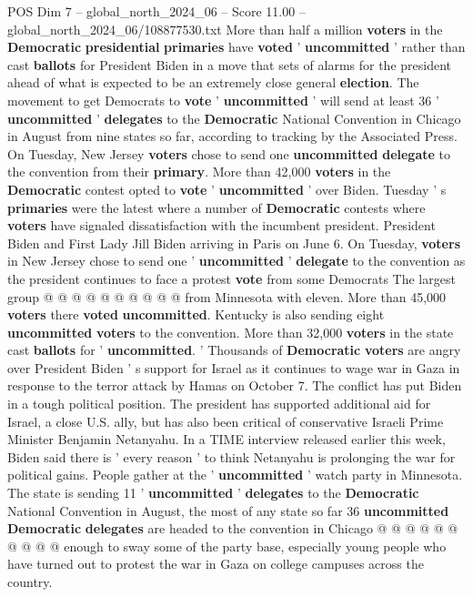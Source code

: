 \begin{textsample}{POS Dim 7 – global\_north\_2024\_06 – Score 11.00 – global\_north\_2024\_06/108877530.txt}  \label{ex:f7_pos_085}
More than half a million \textbf{voters} in the \textbf{Democratic} \textbf{presidential} \textbf{primaries} have \textbf{voted} ' \textbf{uncommitted} ' rather than cast \textbf{ballots} for President Biden in a move that sets of alarms for the president ahead of what is expected to be an extremely close general \textbf{election}.
The movement to get Democrats to \textbf{vote} ' \textbf{uncommitted} ' will send at least 36 ' \textbf{uncommitted} ' \textbf{delegates} to the \textbf{Democratic} National Convention in Chicago in August from nine states so far, according to tracking by the Associated Press.
On Tuesday, New Jersey \textbf{voters} chose to send one \textbf{uncommitted} \textbf{delegate} to the convention from their \textbf{primary}.
More than 42,000 \textbf{voters} in the \textbf{Democratic} contest opted to \textbf{vote} ' \textbf{uncommitted} ' over Biden.
Tuesday ' s \textbf{primaries} were the latest where a number of \textbf{Democratic} contests where \textbf{voters} have signaled dissatisfaction with the incumbent president.
President Biden and First Lady Jill Biden arriving in Paris on June 6.
On Tuesday, \textbf{voters} in New Jersey chose to send one ' \textbf{uncommitted} ' \textbf{delegate} to the convention as the president continues to face a protest \textbf{vote} from some Democrats The largest group @ @ @ @ @ @ @ @ @ @ from Minnesota with eleven.
More than 45,000 \textbf{voters} there \textbf{voted} \textbf{uncommitted}.
Kentucky is also sending eight \textbf{uncommitted} \textbf{voters} to the convention.
More than 32,000 \textbf{voters} in the state cast \textbf{ballots} for ' \textbf{uncommitted}. ' Thousands of \textbf{Democratic} \textbf{voters} are angry over President Biden ' s support for Israel as it continues to wage war in Gaza in response to the terror attack by Hamas on October 7.
The conflict has put Biden in a tough political position.
The president has supported additional aid for Israel, a close U.S. ally, but has also been critical of conservative Israeli Prime Minister Benjamin Netanyahu.
In a TIME interview released earlier this week, Biden said there is ' every reason ' to think Netanyahu is prolonging the war for political gains.
People gather at the ' \textbf{uncommitted} ' watch party in Minnesota.
The state is sending 11 ' \textbf{uncommitted} ' \textbf{delegates} to the \textbf{Democratic} National Convention in August, the most of any state so far 36 \textbf{uncommitted} \textbf{Democratic} \textbf{delegates} are headed to the convention in Chicago @ @ @ @ @ @ @ @ @ @ enough to sway some of the party base, especially young people who have turned out to protest the war in Gaza on college campuses across the country.

\end{textsample}
